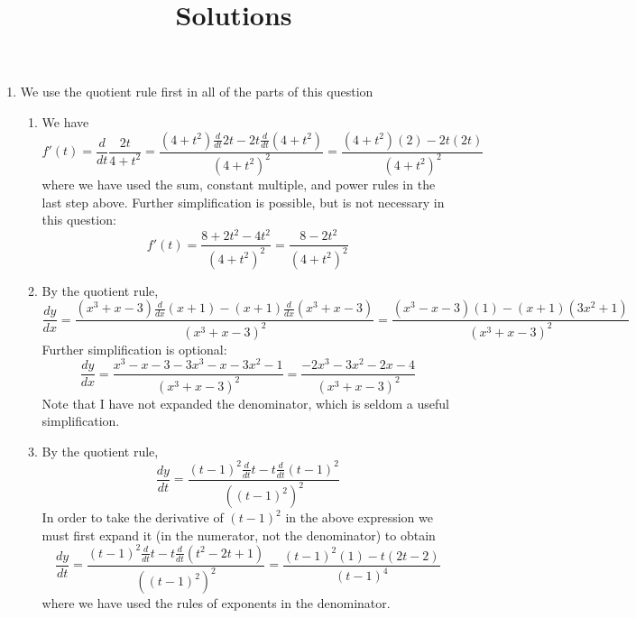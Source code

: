 \documentclass{article}
\title{\commonPSTitleZeroTwoThree\ Solutions}
\author{\commonAuthor}
\date{\commonDateZeroTwoThree}
\begin{document}
\maketitle
\begin{enumerate}
\item %
  We use the quotient rule first in all of the parts of this question
  \begin{enumerate}
  \item 
    We have
    \begin{equation*}
      f'(t) = \frac{d}{dt} \frac{2t}{4+t^2}
      = \frac{(4+t^2) \frac{d}{dt} 2t - 2t \frac{d}{dt} (4+t^2)}{(4+t^2)^2}
      = \frac{(4+t^2)(2) - 2t (2t)}{(4+t^2)^2}
    \end{equation*}
    where we have used the sum, constant multiple, and power rules in the
    last step above.  Further simplification is possible, but is not necessary
    in this question:
    \begin{equation*}
      f'(t) = \frac{8 + 2t^2 - 4t^2}{(4+t^2)^2}
      = \frac{8-2t^2}{(4+t^2)^2}
    \end{equation*}
  \item By the quotient rule,
    \begin{equation*}
      \frac{dy}{dx} = \frac{(x^3+x-3)\frac{d}{dx}(x+1) - (x+1) \frac{d}{dx} 
        (x^3+x-3)}{(x^3+x-3)^2}
      = \frac{(x^3-x-3)(1) - (x+1) (3x^2+1)}{(x^3+x-3)^2}
    \end{equation*}
    Further simplification is optional:
    \begin{equation*}
      \frac{dy}{dx} = \frac{x^3-x-3-3x^3-x-3x^2-1}{(x^3+x-3)^2}
      = \frac{-2x^3-3x^2-2x-4}{(x^3+x-3)^2}
    \end{equation*}
    Note that I have not expanded the denominator, which is seldom a useful
    simplification.
  \item By the quotient rule, 
    \begin{equation*}
      \frac{dy}{dt} = \frac{(t-1)^2\frac{d}{dt} t - t \frac{d}{dt} (t-1)^2}{
        ((t-1)^2)^2}
    \end{equation*}
    In order to take the derivative of $(t-1)^2$ in the above expression
    we must first expand it (in the numerator, not the denominator) to
    obtain
    \begin{equation*}
      \frac{dy}{dt} = \frac{(t-1)^2\frac{d}{dt} t - t \frac{d}{dt}(t^2-2t+1)}{
        ((t-1)^2)^2}
      = \frac{(t-1)^2(1) - t (2t-2)}{(t-1)^4}
    \end{equation*}
    where we have used the rules of exponents in the denominator.

\end{enumerate}
\end{enumerate}
\end{document}
